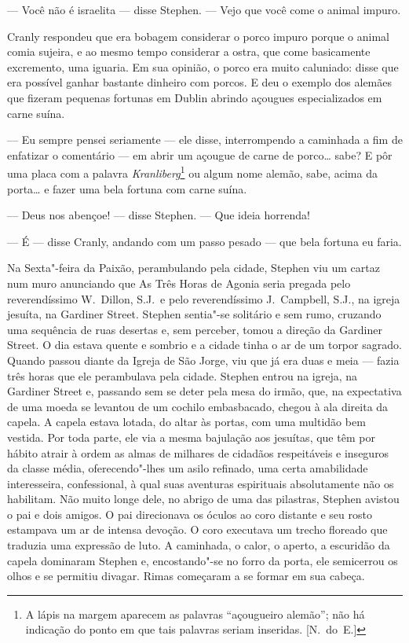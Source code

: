 --- Você não é israelita --- disse Stephen.  --- Vejo que você come o animal
impuro.

Cranly respondeu que era bobagem considerar o porco impuro porque o animal
comia sujeira, e ao mesmo tempo considerar a ostra, que come basicamente
excremento, uma iguaria.  Em sua opinião, o porco era muito caluniado: disse
que era possível ganhar bastante dinheiro com porcos.  E deu o exemplo dos
alemães que fizeram pequenas fortunas em Dublin abrindo açougues especializados
em carne suína.

--- Eu sempre pensei seriamente --- ele disse, interrompendo a caminhada a fim
de enfatizar o comentário --- em abrir um açougue de carne de porco\ldots{} sabe?  E
pôr uma placa com a palavra \textit{Kranliberg}\footnote{ A lápis na margem
aparecem as palavras “açougueiro alemão”; não há indicação do ponto em que tais
palavras seriam inseridas. [N.~do~E.]} ou algum nome alemão, sabe, acima da
porta\ldots{} e fazer uma bela fortuna com carne suína.

--- Deus nos abençoe! --- disse Stephen.  --- Que ideia horrenda!

--- É --- disse Cranly, andando com um passo pesado --- que bela fortuna eu
faria.

Na Sexta"-feira da Paixão, perambulando pela cidade, Stephen viu um cartaz num
muro anunciando que As Três Horas de Agonia seria pregada pelo reverendíssimo		
W.~Dillon, S.J.~e pelo reverendíssimo J.~Campbell, S.J., na igreja jesuíta,
na Gardiner Street.  Stephen sentia"-se solitário e sem rumo, cruzando uma
sequência de ruas desertas e, sem perceber, tomou a direção da Gardiner Street.
O dia estava quente e sombrio e a cidade tinha o ar de um torpor sagrado.
Quando passou diante da Igreja de São Jorge, viu que já era duas e meia ---
fazia três horas que ele perambulava pela cidade.  Stephen entrou na igreja, na
Gardiner Street e, passando sem se deter pela mesa do irmão, que, na
expectativa de uma moeda se levantou de um cochilo embasbacado, chegou à ala
direita da capela.  A capela estava lotada, do altar às portas, com uma
multidão bem vestida.  Por toda parte, ele via a mesma bajulação aos jesuítas,
que têm por hábito atrair à ordem as almas de milhares de cidadãos respeitáveis
e inseguros da classe média, oferecendo"-lhes um asilo refinado, uma certa
amabilidade interesseira, confessional, à qual suas aventuras espirituais
absolutamente não os habilitam.  Não muito longe dele, no abrigo de uma das
pilastras, Stephen avistou o pai e dois amigos.  O pai direcionava os óculos ao
coro distante e seu rosto estampava um ar de intensa devoção.  O coro executava
um trecho floreado que traduzia uma expressão de luto.  A caminhada, o calor, o
aperto, a escuridão da capela dominaram Stephen e, encostando"-se no forro da
porta, ele semicerrou os olhos e se permitiu divagar.  Rimas começaram a se
formar em sua cabeça.

